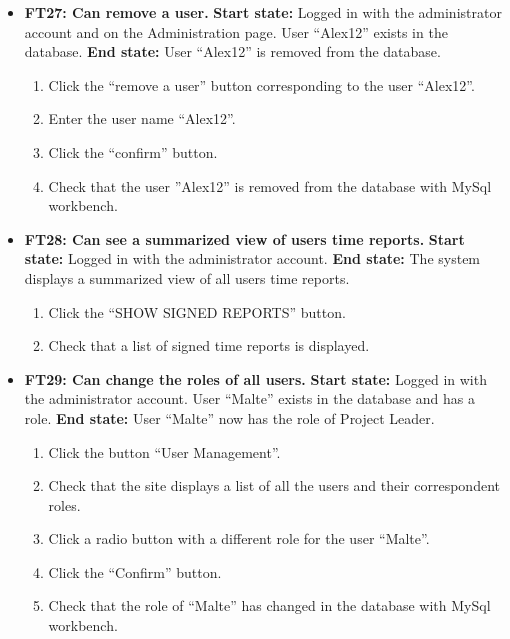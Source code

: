 \documentclass{article}
\begin{document}
\begin{itemize}
		
		\item \textbf{FT27: Can remove a user.} \newline
		\textbf{Start state:} Logged in with the administrator account and on the Administration page. User “Alex12” exists in the database. \newline
		\textbf{End state:} User “Alex12”  is removed from the database.
		\begin{enumerate}
			\item Click the “remove a user” button corresponding to the user “Alex12”.
			\item Enter the user name “Alex12”.
			\item Click the “confirm” button.
			\item Check that the user ”Alex12” is removed from the database with MySql workbench.
		\end{enumerate}
		
		
		\item \textbf{FT28: Can see a summarized view of users time reports.} \newline
		\textbf{Start state:} Logged in with the administrator account.  \newline
		\textbf{End state:} The system displays a summarized view of all users time reports.
		\begin{enumerate}
			\item Click the “SHOW SIGNED REPORTS” button.
			\item Check that a list of signed time reports is displayed.
		\end{enumerate}
		
		
		\item \textbf{FT29: Can change the roles of all users.} \newline
		\textbf{Start state:} Logged in with the administrator account. User “Malte” exists in the database and has a role.  \newline
		\textbf{End state:} User “Malte” now has the role of Project Leader.
		\begin{enumerate}
			\item Click the button “User Management”.
			\item Check that the site displays a list of all the users and their correspondent roles.
			\item Click a radio button with a different role for the user “Malte”.
			\item Click the “Confirm” button. 
			\item Check that the role of “Malte” has changed in the database with MySql workbench.
		\end{enumerate}
		

\end{itemize}
\end{document}
